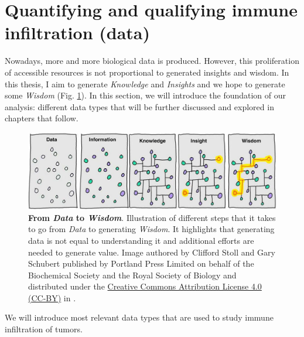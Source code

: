 \documentclass[12pt,]{book}
\theoremstyle{definition}
\theoremstyle{definition}
\theoremstyle{definition}
\theoremstyle{remark}
\begin{document}
\hypertarget{quantifying-and-qualifying-immune-infiltration-data}{%
\section{Quantifying and qualifying immune infiltration
(data)}\label{quantifying-and-qualifying-immune-infiltration-data}}

Nowadays, more and more biological data is produced. However, this
proliferation of accessible resources is not proportional to generated
insights and wisdom. In this thesis, I aim to generate \emph{Knowledge}
and \emph{Insights} and we hope to generate some \emph{Wisdom} (Fig.
\ref{fig:information-power}). In this section, we will introduce the
foundation of our analysis: different data types that will be further
discussed and explored in chapters that follow.

\begin{figure}

{\centering \includegraphics[width=0.8\linewidth]{figures-ext/01-Information_power} 

}

\caption[From Data to Wisdom]{\textbf{From \emph{Data} to
\emph{Wisdom}}. Illustration of different steps that it takes to go from
\emph{Data} to generating \emph{Wisdom}. It highlights that generating
data is not equal to understanding it and additional efforts are needed
to generate value. Image authored by Clifford Stoll and Gary Schubert
published by Portland Press Limited on behalf of the Biochemical Society
and the Royal Society of Biology and distributed under the
\href{https://creativecommons.org/licenses/by/4.0/}{Creative Commons
Attribution License 4.0 (CC-BY)} in \citep{Ponting2017}.}\label{fig:information-power}
\end{figure}











We will introduce most relevant data types that are used to study immune
infiltration of tumors.
\end{document}
